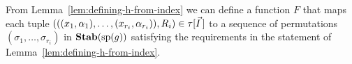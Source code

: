 \documentclass[../main/thesis.tex]{subfiles}
\begin{document}



From Lemma~\ref{lem:defining-h-from-index} we can define a function $F$ that
maps each tuple $(((x_1, \alpha_1), \ldots, (x_{r_i}, \alpha_{r_i})), R_i) \in
\tau[\vec{I}\,]$ to a sequence of permutations $(\sigma_1, \ldots,
\sigma_{r_i})$ in $\text{\textbf{Stab}} (\text{sp} (g))$ satisfying the requirements in the statement of
Lemma~\ref{lem:defining-h-from-index}.
\end{document}
